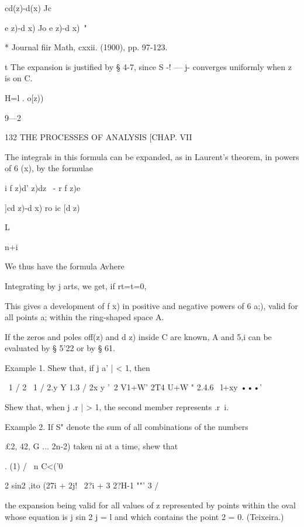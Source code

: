  cd(z)-d(x) Jc 



e z)-d x) Jo e z)-d x)\  " 

* Journal fiir Math, cxxii. (1900), pp. 97-123. 

t The expansion is justified by § 4-7, since S -! —   j- converges uniformly when z is on C. 

H=l . o[z)) 



9—2 



132 THE PROCESSES OF ANALYSIS [CHAP. VII 

The integrals in this formula can be expanded, as in Laurent's theorem, 
in powers of 6 (x), by the formulae 



i f z)d' z)dz \  - r f z)e  

]cd z)-d x)  ro    ic [d z)\ 

L 



n+i 



We thus have the formula 
Avhere 

Integrating by j arts, we get, if rt=t=0, 

This gives a development of f x) in positive and negative powers of 
6 a;), valid for all points a; within the ring-shaped space A. 

If the zeros and poles off(z) and d z) inside C are known, A  and 5,i can 
be evaluated by § 5'22 or by § 61. 

Example 1. Shew that, if j a' | < 1, then 

\ 1 / 2  \ 1 / 2.y Y 1.3 / 2x y 
 '~2 V1+W' 2T4 U+W " 2.4.6 \ l+xy  •••' 

Shew that, when j .r | > 1, the second member represents .r~i. 

Example 2. If S" denote the sum of all combinations of the numbers 

£2, 42, G ... 2n-2)%
taken ni at a time, shew that 

. (1) / \ n C<('0 



2 sin2 ,ito (27i + 2j! \ 2?i + 3 2?H-1 ""'  3 /  



the expansion being valid for all values of z represented by points within the oval whose 
equation is j sin 2 j = l and which contains the point 2 = 0. (Teixeira.) 

